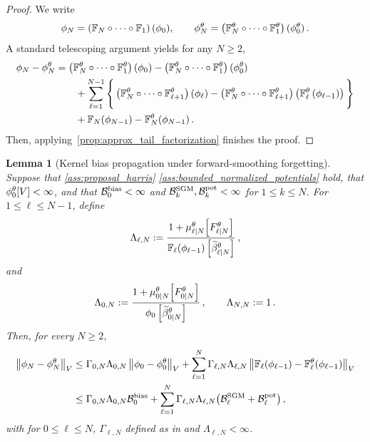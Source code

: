 \documentclass[11pt]{article}
\theoremstyle{plain}
\newtheorem{lemma}[theorem]{Lemma}
\theoremstyle{definition}
\theoremstyle{remark}
\begin{document}
\begin{proof}
We write
$$
\filter{N}= \left( \filtertransform{N} \circ \cdots \circ \filtertransform{1} \right)(\filter{0}),
\qquad
\approxfilter{N}= \left( \filtertransform{N}[\theta] \circ \cdots  \circ \filtertransform{1}[\theta]\right) (\approxfilter{0}) \eqsp.
$$
A standard telescoping argument yields for any $N \geq 2$,
\begin{align*}
\filter{N}-\approxfilter{N}
&=
\left( \filtertransform{N}[\theta] \circ \cdots  \circ \filtertransform{1}[\theta]\right) (\filter{0})-
\left( \filtertransform{N}[\theta] \circ \cdots  \circ \filtertransform{1}[\theta]\right) (\approxfilter{0})
\\
&\qquad
+
\sum_{\ell=1}^{N-1} \Bigg\{
\left( \filtertransform{N}[\theta] \circ \cdots \circ \filtertransform{\ell+1}[\theta] \right) \left( \filter{\ell} \right) 
-
\left( \filtertransform{N}[\theta] \circ \cdots \circ \filtertransform{\ell+1}[\theta] \right) \left( \filtertransform{\ell}[\theta] \left(  \filter{\ell-1} \right) \right) \Bigg\}
\\
&\qquad
+
\filtertransform{N}(\filter{N-1})
-
\filtertransform{N}[\theta](\filter{N-1}) \eqsp.
\end{align*}
Then, applying~\cref{prop:approx_tail_factorization} finishes the proof.
\end{proof}


\begin{lemma}[Kernel bias propagation under forward-smoothing forgetting]
\label{prop:kernel_bias_from_forward_forgetting}
Suppose that \ref{ass:proposal_harris} \ref{ass:bounded_normalized_potentials} hold,
that $\approxfilter{0}[V]<\infty$, and that
$\mathcal B_0^{\rm bias}<\infty$ and
$\mathcal B_k^{\rm SGM},\mathcal B_k^{\rm pot}<\infty$ for
$1\le k\le N$. For $1\le \ell\le N-1$, define
$$
\Lambda_{\ell,N} \eqdef \frac{ 1+\muBias{\ell}{N}[\theta]\!\left[ F_{\ell|N}^{\theta}\right] }{ \filtertransform{\ell} (\filter{\ell-1}) \left[ \normbackwardfun{\ell}{N}[\theta] \right] } \eqsp,
$$
and
$$
\Lambda_{0,N} \eqdef \frac{ 1+ \muBias{0}{N}[\theta]\!\left[F_{0|N}^{\theta}\right] }{\filter{0}\left[\normbackwardfun{0}{N}[\theta]\right] } \eqsp, \qquad \Lambda_{N,N}\eqdef 1 \eqsp.
$$
Then, for every $N\ge2$,
\begin{align}
\label{eq:kernel_bias_gamma_local_bound}
\vnorm[ \filter{N}-\approxfilter{N}][V]
&\le \Gamma_{0,N}\Lambda_{0,N}\vnorm[\filter{0}-\approxfilter{0}][V] + \sum_{\ell=1}^{N} \Gamma_{\ell,N}\Lambda_{\ell,N}
\vnorm[ \filtertransform{\ell}(\filter{\ell-1})- \filtertransform{\ell}[\theta](\filter{\ell-1})][V] \nonumber\\
&\le \Gamma_{0,N}\Lambda_{0,N} \mathcal B_0^{\rm bias} + \sum_{\ell=1}^{N} \Gamma_{\ell,N}\Lambda_{\ell,N}
\bigl(\mathcal B_\ell^{\rm SGM}+\mathcal B_\ell^{\rm pot}\bigr) \eqsp,
\end{align}
with for $0\le \ell\le N$, $\Gamma_{\ell,N}$ defined as in  and $\Lambda_{\ell,N} < \infty$.
\end{lemma}
\end{document}
